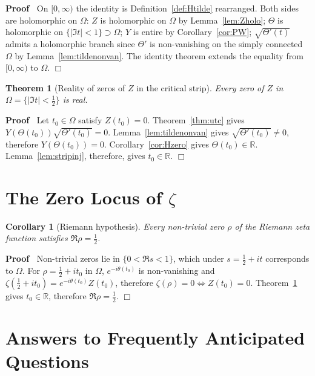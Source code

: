 \documentclass{article}
\newenvironment{proof}{\noindent\textbf{Proof\ }}{\hspace*{\fill}$\Box$\medskip}
\newtheorem{corollary}{Corollary}
\newtheorem{theorem}{Theorem}
\begin{document}
\begin{proof}
  On $[0, \infty)$ the identity is Definition~\ref{def:Htilde} rearranged.
  Both sides are holomorphic on $\Omega$: $Z$ is holomorphic on $\Omega$ by
  Lemma~\ref{lem:Zholo}; $\Theta$ is holomorphic on $\{| \Im t| < 1\} \supset
  \Omega$; $Y$ is entire by Corollary~\ref{cor:PW}; $\sqrt{\Theta' (t)}$
  admits a holomorphic branch since $\Theta'$ is non-vanishing on the simply
  connected $\Omega$ by Lemma~\ref{lem:tildenonvan}. The identity theorem
  extends the equality from $[0, \infty)$ to $\Omega$.
\end{proof}

\begin{theorem}
  [Reality of zeros of $Z$ in the critical strip]\label{thm:Zreal} Every zero
  of $Z$ in $\Omega = \{| \Im t| < \tfrac{1}{2} \}$ is real.
\end{theorem}

\begin{proof}
  Let $t_0 \in \Omega$ satisfy $Z (t_0) = 0$. Theorem~\ref{thm:utc} gives $Y
  (\Theta (t_0)) \sqrt{\Theta' (t_0)} = 0$. Lemma~\ref{lem:tildenonvan} gives
  $\sqrt{\Theta' (t_0)} \ne 0$, therefore $Y (\Theta (t_0)) = 0$.
  Corollary~\ref{cor:Hzero} gives $\Theta (t_0) \in \mathbb{R}$.
  Lemma~\ref{lem:stripinj}, therefore, gives $t_0 \in \mathbb{R}$.
\end{proof}

\section{The Zero Locus of $\zeta$}

\begin{corollary}
  [Riemann hypothesis]\label{cor:RH} Every non-trivial zero $\rho$ of the
  Riemann zeta function satisfies $\Re \rho = \tfrac{1}{2}$.
\end{corollary}

\begin{proof}
  Non-trivial zeros lie in $\{0 < \Re s < 1\}$, which under $s = \tfrac{1}{2}
  + it$ corresponds to $\Omega$. For $\rho = \tfrac{1}{2} + it_0$ in $\Omega$,
  $e^{- i \theta (t_0)}$ is non-vanishing and $\zeta (\tfrac{1}{2} + it_0) =
  e^{- i \theta (t_0)} Z (t_0)$, therefore $\zeta (\rho) = 0
  \Longleftrightarrow Z (t_0) = 0$. Theorem~\ref{thm:Zreal} gives $t_0 \in
  \mathbb{R}$, therefore $\Re \rho = \tfrac{1}{2}$.
\end{proof}

\section{Answers to Frequently Anticipated Questions}\label{app:FAQ}
\end{document}
